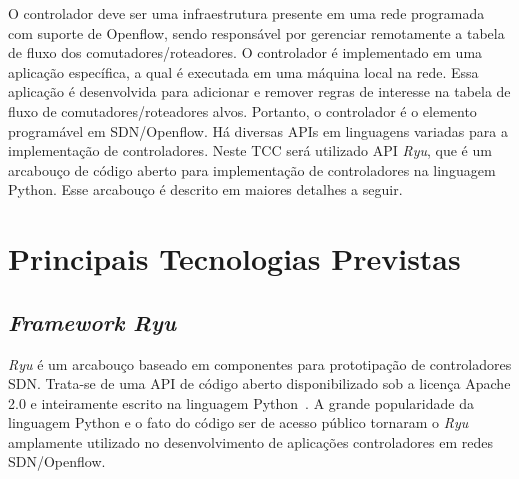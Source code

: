 \documentclass[	12pt, Times, openright, twoside, a4paper, english, brazil]{abntex2}
\begin{document}
O controlador deve ser uma infraestrutura presente em uma rede programada com suporte de Openflow, sendo responsável por gerenciar remotamente a tabela de fluxo dos comutadores/roteadores. O controlador é implementado em uma aplicação específica, a qual é executada em uma máquina local na rede. Essa aplicação é desenvolvida para adicionar e remover regras de interesse na tabela de fluxo de comutadores/roteadores alvos. Portanto, o controlador é o elemento programável em SDN/Openflow. Há diversas APIs em linguagens variadas para a implementação de controladores. Neste TCC será utilizado API \textit{Ryu}, que é um arcabouço de código aberto para implementação de controladores na linguagem Python. Esse arcabouço é descrito em maiores detalhes a seguir.




\section{Principais Tecnologias Previstas}


\subsection{\textit{Framework Ryu}}


\textit{Ryu} é um arcabouço baseado em componentes para prototipação de controladores SDN. Trata-se de uma API de código aberto disponibilizado sob a licença Apache 2.0 e inteiramente escrito na linguagem Python~\cite{ryu_site}. A grande popularidade da linguagem Python e o fato do código ser de acesso público tornaram o \textit{Ryu} amplamente utilizado no desenvolvimento de aplicações controladores em redes SDN/Openflow.
\end{document}
